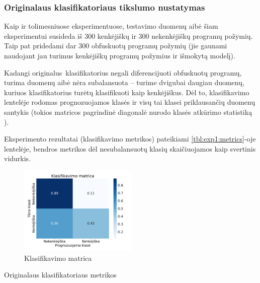 \subsubsection{Originalaus klasifikatoriaus tikslumo nustatymas}\label{sec:exp:1}

Kaip ir tolimesniuose eksperimentuose, testavimo duomenų aibė šiam
eksperimentui susideda iš 300 kenkėjiškų ir 300 nekenkėjiškų programų požymių.
Taip pat pridedami dar 300 obfuskuotų programų požymių (jie gaunami naudojant
jau turimus kenkėjiškų programų požymius ir išmokytą \MALGAN modelį).

Kadangi originalus\footnotemark~klasifikatorius negali diferencijuoti
obfuskuotų programų, turima duomenų aibė nėra subalansuota -- turime dvigubai
daugiau duomenų, kuriuos klasifikatorius turėtų klasifikuoti kaip kenkėjiškus.
Dėl to, klasifikavimo lentelėje  rodomas prognozuojamos
klasės ir visų tai klasei priklausančių duomenų santykis (tokios matricos
pagrindinė diagonalė nurodo klasės atkūrimo statistiką ).

Eksperimento rezultatai (klasifikavimo metrikos) pateikiami
\ref{tbl:exp1:metrics}-oje lentelėje, bendros metrikos dėl nesubalansuotų klasių skaičiuojamos kaip svertinis vidurkis.
\begin{figure}[h]
    \centering
    \includegraphics[width=0.5\textwidth]{images/normal_2x2.png}
    \caption{Klasifikavimo matrica}
    \label{fig:exp1:confusion}
\end{figure}

\begin{table}[h]
    \caption{Originalaus klasifikatoriaus metrikos}
    \centering
    \label{tbl:exp1:metrics}
\end{table}

